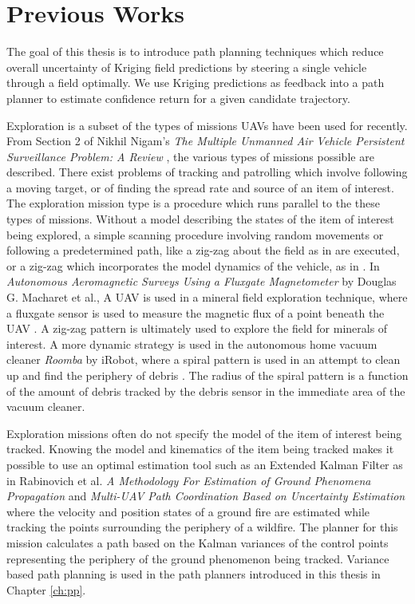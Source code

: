 \section{Previous Works}
The goal of this thesis is to introduce path planning techniques which reduce overall uncertainty of Kriging field predictions by steering a single vehicle through a field optimally. We use Kriging predictions as feedback into a path planner to estimate confidence return for a given candidate trajectory.

Exploration is a subset of the types of missions UAVs have been used for recently. From Section 2 of Nikhil Nigam's \textit{The Multiple Unmanned Air Vehicle Persistent Surveillance Problem: A Review} \cite{nigam:missions}, the various types of missions possible are described. There exist problems of tracking and patrolling which involve following a moving target, or of finding the spread rate and source of an item of interest. The exploration mission type is a procedure which runs parallel to the these types of missions. Without a model describing the states of the item of interest being explored, a simple scanning procedure involving random movements or following a predetermined path, like a zig-zag about the field as in \cite{semsch:uav_zig} are executed, or a zig-zag which incorporates the model dynamics of the vehicle, as in \cite{nigam:zigzag}. In \textit{Autonomous Aeromagnetic Surveys Using a Fluxgate Magnetometer} by Douglas G. Macharet et al., A UAV is used in a mineral field exploration technique, where a fluxgate sensor is used to measure the magnetic flux of a point beneath the UAV \cite{macharet:magnet}. A zig-zag pattern is ultimately used to explore the field for minerals of interest. A more dynamic strategy is used in the autonomous home vacuum cleaner \textit{Roomba} by iRobot, where a spiral pattern is used in an attempt to clean up and find the periphery of debris \cite{roomba:spiral}. The radius of the spiral pattern is a function of the amount of debris tracked by the debris sensor in the immediate area of the vacuum cleaner.

Exploration missions often do not specify the model of the item of interest being tracked. Knowing the model and kinematics of the item being tracked makes it possible to use an optimal estimation tool such as an Extended Kalman Filter as in Rabinovich et al. \textit{A Methodology For Estimation of Ground Phenomena Propagation} \cite{sharon:uav_est} and \textit{Multi-UAV Path Coordination Based on Uncertainty Estimation} \cite{sharon:uav_uncert} where the velocity and position states of a ground fire are estimated while tracking the points surrounding the periphery of a wildfire. The planner for this mission calculates a path based on the Kalman variances of the control points representing the periphery of the ground phenomenon being tracked. Variance based path planning is used in the path planners introduced in this thesis in Chapter \ref{ch:pp}.

